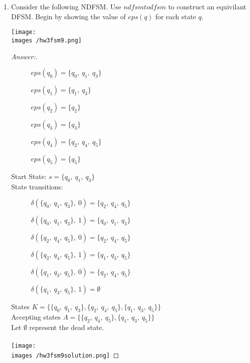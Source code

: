 \documentclass[10pt]{article}
\newcommand{\images}{/home/gparker/classes/341/images}
\begin{document}
\begin{enumerate}
\item
Consider the following NDFSM. Use $ndfsmtodfsm$ to construct an equivilant DFSM.  Begin by showing the value of $eps(q)$ for each state $q$.

\begin{center}
\texttt{[image: \\images /hw3fsm9.png]}
\end{center}

\begin{proof}[Answer:]$ $\\
\begin{description}
\item[] $eps(q_0) = \{q_0,\ q_1,\ q_3\}$
\item[] $eps(q_1) = \{q_1,\ q_3\}$
\item[] $eps(q_2) = \{q_2\}$
\item[] $eps(q_3) = \{q_3\}$ 
\item[] $eps(q_4) = \{q_2,\ q_4,\ q_5\}$
\item[] $eps(q_5) = \{q_5\}$
\end{description}
Start State: $s = \{q_0,\ q_1,\ q_3\}$ \\
State transitions: \\
\begin{description}
\item[] $\delta (\{q_0,\ q_1,\ q_3\},\ 0) = \{q_2,\ q_4,\ q_5\}$
\item[] $\delta (\{q_0,\ q_1,\ q_3\},\ 1) = \{q_0,\ q_1,\ q_3\}$
\item[]
\item[] $\delta (\{q_2,\ q_4,\ q_5\},\ 0) = \{q_2,\ q_4,\ q_5\}$
\item[] $\delta (\{q_2,\ q_4,\ q_5\},\ 1) = \{q_1,\ q_3,\ q_5\}$
\item[]
\item[] $\delta (\{q_1,\ q_3,\ q_5\},\ 0) = \{q_2,\ q_4,\ q_5\}$
\item[] $\delta (\{q_1,\ q_3,\ q_5\},\ 1) = \emptyset$
\end{description}
States $K = \{\{q_0,\ q_1,\ q_3\}, \{q_2,\ q_4,\ q_5\}, \{q_1,\ q_3,\ q_5\}\}$ \\
Accepting states $A = \{\{q_2,\ q_4,\ q_5\}, \{q_1,\ q_3,\ q_5\}\}$ \\
Let $\emptyset$ represent the dead state. \\ \\
\texttt{[image: \\images /hw3fsm9solution.png]}
\end{proof}
\end{enumerate}
\end{document}
